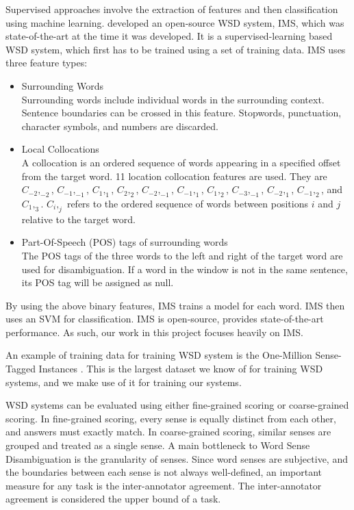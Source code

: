 \documentclass[11pt]{article}
\begin{document}
Supervised approaches involve the extraction of features and then classification using machine learning.  developed an open-source WSD system, IMS, which was state-of-the-art at the time it was developed. It is a supervised-learning based WSD system, which first has to be trained using a set of training data. IMS uses three feature types:

\begin{itemize}
	
	\item  Surrounding Words\\
	Surrounding words include individual words in the surrounding context. Sentence boundaries can be crossed in this feature. Stopwords, punctuation, character symbols, and numbers are discarded. 
	
	\item Local Collocations\\
	A collocation is an ordered sequence of words appearing in a specified offset from the target word. 11 location collocation features are used. They are $C_{-2},_{-2}$, $C_{-1},_{-1}$,
	$C_{1},_{1}$, $C_{2},_{2}$, $C_{-2},_{-1}$, $C_{-1},_{1}$, $C_{1},_{2}$, $C_{-3},_{-1}$,
	$C_{-2},_{1}$, $C_{-1},_{2}$, and $C_{1},_{3}$. $C_{i},_{j}$ refers to the ordered sequence of words between positions $i$ and $j$ relative to the target word. 
	
	\item Part-Of-Speech (POS) tags of surrounding words\\
	The POS tags of the three words to the left and right of the target word are used for disambiguation. If a word in the window is not in the same sentence, its POS tag will be assigned as null. %
\end{itemize} 

By using the above binary features, IMS trains a model for each word. IMS then uses an SVM for classification. IMS is open-source, provides state-of-the-art performance. As such, our work in this project focuses heavily on IMS. 

An example of training data for training WSD system is the One-Million Sense-Tagged Instances \cite{taghipour2015one}. This is the largest dataset we know of for training WSD systems, and we make use of it for training our systems. 

WSD systems can be evaluated using either fine-grained scoring or coarse-grained scoring. In fine-grained scoring, every sense is equally distinct from each other, and answers must exactly match. In coarse-grained scoring, similar senses are grouped and treated as a single sense. A main bottleneck to Word Sense Disambiguation is the granularity of senses. Since word senses are subjective, and the boundaries between each sense is not always well-defined, an important measure for any task is the inter-annotator agreement. The inter-annotator agreement is considered the upper bound of a task. 
\end{document}
